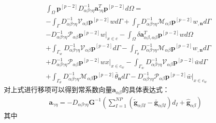 \begin{equation}
\begin{split}
        &\int_{\Omega}\pmb{p}^{[p-2]}D^{-1}_{\alpha\beta\gamma\eta}\pmb{a}_{\gamma\eta}^T\pmb{p}^{[p-2]}d\Omega=\\
        &-\int_{\Gamma}D_{\alpha\beta\gamma\eta}^{-1}\mathcal{V}_{\alpha\beta}\pmb{p}^{[p-2]}wd\Gamma
        +\int_{\Gamma}D_{\alpha\beta\gamma\eta}^{-1}\mathcal{M}_{\alpha\beta}\pmb{p}^{[p-2]}w_{,\pmb{n}}d\Gamma\\
        &-D_{\alpha\beta\gamma\eta}^{-1}\mathcal{P}_{\alpha\beta}\pmb{p}^{[p-2]}w\vert_{x\in c}
        -\int_{\Omega}\delta\pmb{a}_{\alpha\beta,\alpha\beta}^T\pmb{p}^{[p-2]}wd\Omega\\
        &+\int_{\Gamma_w}D_{\alpha\beta\gamma\eta}^{-1}\mathcal{V}_{\alpha\beta}\pmb{p}^{[p-2]}d\Gamma
        -\int_{\Gamma_{\theta}}D_{\alpha\beta\gamma\eta}^{-1}\mathcal{M}_{\alpha\beta}\pmb{p}^{[p-2]}w_{,\pmb{n}}d\Gamma\\
        &+D_{\alpha\beta\gamma\eta}^{-1}\mathcal{P}_{\alpha\beta}\pmb{p}^{[p-2]}wx\vert_{x\in{c_w}}
        -\int_{\Gamma_w}D_{\alpha\beta\gamma\eta}^{-1}\mathcal{V}_{\alpha\beta}\pmb{p}^{[p-2]}\bar{w}d\Gamma\\
        &+\int_{\Gamma_{\theta}}D_{\alpha\beta\gamma\eta}^{-1}\mathcal{M}_{\alpha\beta}\pmb{p}^{[p-2]}\bar{\theta}_{\pmb{n}}d\Gamma
        -D_{\alpha\beta\gamma\eta}^{-1}\mathcal{P}_{\alpha\beta}\pmb{p}^{[p-2]}\bar{w}\vert_{x\in{c_w}}
\end{split}
\end{equation}
对上式进行移项可以得到常系数向量$\pmb{a}_{\alpha\beta}$的具体表达式：
\begin{equation}\label{aalphabeta}
\begin{split}
    \pmb{a}_{\gamma\eta}=-D_{\alpha\beta\gamma\eta}\pmb{G}^{-1}(\sum_{I=1}^{N\!P}(\tilde{\pmb g}_{\alpha\beta I}-\bar{\pmb g}_{\alpha\beta I})d_I+\hat{\pmb g}_{\alpha\beta})
\end{split}
\end{equation}
其中
\newpage
